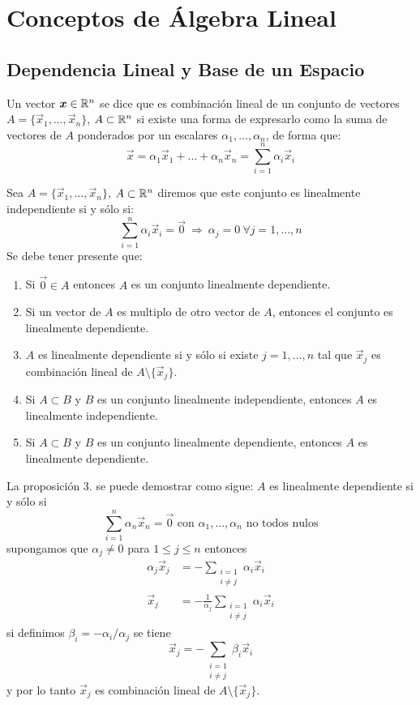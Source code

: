 \chapter{Conceptos de \'Algebra Lineal}\label{ap2}

\section{Dependencia Lineal y Base de un Espacio}

\begin{definicion}
Un vector $\boldsymbol{x}\in \mathbb{R}^n$ se dice que es combinaci\'on lineal de un conjunto de vectores $A = \{ \vec{x}_1, \ldots,\vec{x}_n \}$, $A\subset \mathbb{R}^n$ si existe una forma de expresarlo como la suma de vectores de $A$ ponderados por un escalares $\alpha_1,\ldots,\alpha_n$, de forma que:
$$\vec{x} = \alpha_1 \vec{x}_1 + \ldots + \alpha_n \vec{x}_n = \sum_{i=1}^n \alpha_i \vec{x}_i$$
\end{definicion}

\begin{definicion}
Sea $A=\{\vec{x}_1,\ldots,\vec{x}_n\}$, $A\subset \mathbb{R}^n$ diremos que este conjunto es linealmente independiente si y s\'olo si:
$$\sum_{i=1}^n \alpha_i \vec{x}_i = \vec{0} \:\Rightarrow\: \alpha_j=0 \:\forall j=1,\ldots,n$$
Se debe tener presente que:
\begin{enumerate}
\item Si $\vec{0}\in A$ entonces $A$ es un conjunto linealmente dependiente.
\item Si un vector de $A$ es multiplo de otro vector de $A$, entonces el conjunto es linealmente dependiente.
\item $A$ es linealmente dependiente si y s\'olo si existe $j=1,\ldots,n$ tal que $\vec{x}_j$ es combinaci\'on lineal de $A\setminus \{\vec{x}_j\}$.
\item Si $A\subset B$ y $B$ es un conjunto linealmente independiente, entonces $A$ es linealmente independiente. 
\item Si $A\subset B$ y $B$ es un conjunto linealmente dependiente, entonces $A$ es linealmente dependiente. 
\end{enumerate}
\end{definicion}

La proposici\'on 3. se puede demostrar como sigue: $A$ es linealmente dependiente si y s\'olo si
$$\sum_{i=1}^n \alpha_n \vec{x}_n = \vec{0} \text{ con } \alpha_1,\ldots,\alpha_n \text{ no todos nulos}$$
supongamos que $\alpha_j \neq 0$ para $1\leq j \leq n$ entonces
\begin{align*}
\alpha_j \vec{x}_j &= -\sum_{\substack{i=1\\i\neq j}} \alpha_i \vec{x}_i \\
\vec{x}_j &= -\frac{1}{\alpha_j}\sum_{\substack{i=1\\i\neq j}} \alpha_i \vec{x}_i 
\end{align*}
si definimos $\beta_i = -\alpha_i / \alpha_j$ se tiene
$$\vec{x}_j = -\sum_{\substack{i=1\\i\neq j}} \beta_i \vec{x}_i $$
y por lo tanto $\vec{x}_j$ es combinaci\'on lineal de $A\setminus \{\vec{x}_j\}$.

